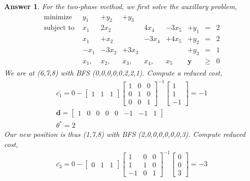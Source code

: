 \documentclass[12pt]{article}
\theoremstyle{colon}
\newtheorem*{answer}{Answer}
\begin{document}
\begin{answer}
  For the two-phase method, we first solve the auxillary problem,
  \begin{gather*}
    \begin{matrix}
      \text{minimize } &y_1 &+y_2 &+y_3 & & & & & \\
      \text{subject to } &x_1 &2x_2 & &4x_4 &-3x_5 &+y_1 &= &2 \\
      &x_1 &+x_2 & &-3x_4 &+4x_5 &+y_2 &= &2 \\
      &-x_1 &-3x_2 &+3x_3 & & &+y_3 &= &1 \\
      &x_1, &x_2, &x_3, &x_4, &x_5 &\textbf{y} &\geq &0
    \end{matrix}
  \end{gather*}
  We are at (6,7,8) with BFS (0,0,0,0,0,2,2,1). Compute a reduced cost,
  \begin{gather*}
    \bar{c_1} = 0 - \begin{bmatrix} 1 & 1 & 1 \end{bmatrix}\begin{bmatrix}
      1 & 0 & 0 \\
      0 & 1 & 0 \\
      0 & 0 & 1
    \end{bmatrix}^{-1} \begin{bmatrix} 1 \\ 1 \\ -1 \end{bmatrix} = -1 \\
    \textbf{d} = \begin{bmatrix} 1 & 0 & 0 & 0 & 0 & -1 & -1 & 1 \end{bmatrix} \\
    \theta^* = 2
  \end{gather*}
  Our new position is thus (1,7,8) with BFS (2,0,0,0,0,0,0,3). Compute reduced cost,
  \begin{gather*}
    \bar{c_3} = 0 - \begin{bmatrix} 0 & 1 & 1 \end{bmatrix}\begin{bmatrix}
      1 & 0 & 0 \\
      1 & 1 & 0 \\
      -1 & 0 & 1
    \end{bmatrix}^{-1} \begin{bmatrix} 0 \\ 0 \\ 3 \end{bmatrix} = -3 \\

\end{gather*}
\end{answer}
\end{document}
